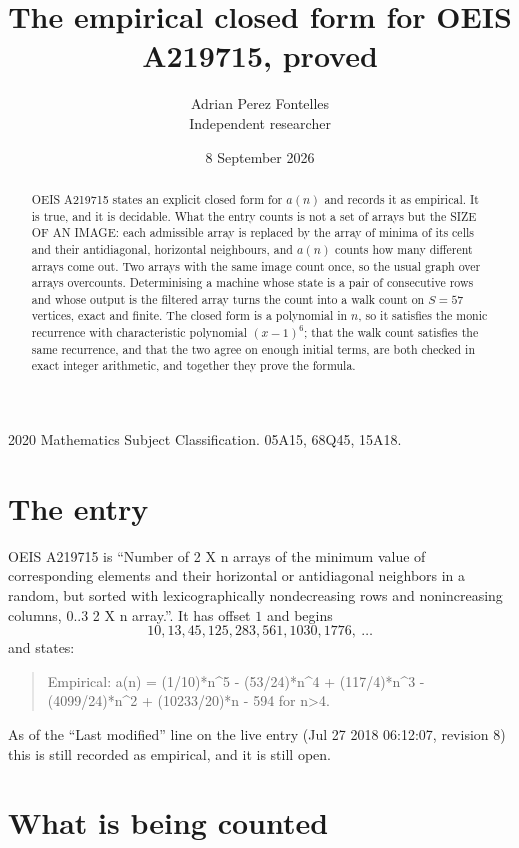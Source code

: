 \documentclass[11pt,a4paper]{article}
\title{The empirical closed form for OEIS A219715, proved}
\author{Adrian Perez Fontelles\\ \small Independent researcher}
\date{8 September 2026}
\theoremstyle{plain}
\theoremstyle{definition}
\begin{document}
\maketitle

\begin{abstract}
OEIS A219715 states an explicit closed form for $a(n)$ and records it as empirical. It is true, and
it is decidable. What the entry counts is not a set of arrays but the SIZE OF AN IMAGE: each
admissible array is replaced by the array of minima of its cells and their antidiagonal, horizontal neighbours,
and $a(n)$ counts how many different arrays come out. Two arrays with the same image count
once, so the usual graph over arrays overcounts. Determinising a machine whose state is a pair
of consecutive rows and whose output is the filtered array turns the count into a walk count on
$S=57$ vertices, exact and finite. The closed form is a polynomial in $n$, so it satisfies the
monic recurrence with characteristic polynomial $(x-1)^{6}$; that the walk count
satisfies the same recurrence, and that the two agree on enough initial terms, are both checked
in exact integer arithmetic, and together they prove the formula.
\end{abstract}

\noindent\small 2020 Mathematics Subject Classification. 05A15, 68Q45, 15A18.\normalsize

\section{The entry}

OEIS A219715 is ``Number of 2 X n arrays of the minimum value of corresponding elements and their horizontal or antidiagonal neighbors in a random, but sorted with lexicographically nondecreasing rows and nonincreasing columns, 0..3 2 X n array.''. It has offset $1$ and begins
\[
10, 13, 45, 125, 283, 561, 1030, 1776,\ \dots
\]
and states:
\begin{quote}
Empirical: a(n) = (1/10)*n\^{}5 - (53/24)*n\^{}4 + (117/4)*n\^{}3 - (4099/24)*n\^{}2 + (10233/20)*n - 594 for n>4.
\end{quote}
As of the ``Last modified'' line on the live entry (Jul 27 2018 06:12:07, revision 8)
this is still recorded as empirical, and it is still open.

\section{What is being counted}
\end{document}
